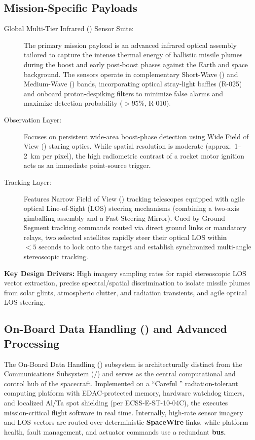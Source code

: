 \subsection{Mission-Specific Payloads}
\begin{description}
    \item[Global Multi-Tier Infrared () Sensor Suite:] The primary mission payload is an advanced infrared optical assembly tailored to capture the intense thermal energy of ballistic missile plumes during the boost and early post-boost phases against the Earth and space background. The sensors operate in complementary Short-Wave () and Medium-Wave () bands, incorporating optical stray-light baffles (R-025) and onboard proton-despiking filters to minimize false alarms and maximize detection probability ($> 95\%$, R-010).
    \item[ Observation Layer:] Focuses on persistent wide-area boost-phase detection using Wide Field of View () staring optics. While spatial resolution is moderate (approx.\ 1--2~km per pixel), the high radiometric contrast of a rocket motor ignition acts as an immediate point-source trigger.
    \item[ Tracking Layer:] Features Narrow Field of View () tracking telescopes equipped with agile optical Line-of-Sight (LOS) steering mechanisms (combining a two-axis gimballing assembly and a Fast Steering Mirror). Cued by Ground Segment tracking commands routed via direct ground links or mandatory  relays, two selected  satellites rapidly steer their optical LOS within $< 5\text{ seconds}$ to lock onto the target and establish synchronized multi-angle stereoscopic tracking.
\end{description}
\textbf{Key Design Drivers:} High imagery sampling rates for rapid stereoscopic LOS vector extraction, precise spectral/spatial discrimination to isolate missile plumes from solar glints, atmospheric clutter, and radiation transients, and agile optical LOS steering.

\subsection[On-Board Data Handling (OBDH) and Advanced Processing]{On-Board Data Handling () and Advanced Processing}
The On-Board Data Handling () subsystem is architecturally distinct from the Communications Subsystem (/) and serves as the central computational and control hub of the spacecraft. Implemented on a ``Careful '' radiation-tolerant computing platform with EDAC-protected memory, hardware watchdog timers, and localized Al/Ta spot shielding (per ECSS-E-ST-10-04C), the  executes mission-critical flight software in real time. Internally, high-rate sensor imagery and LOS vectors are routed over deterministic \textbf{SpaceWire} links, while platform health, fault management, and actuator commands use a redundant \textbf{ bus}.


